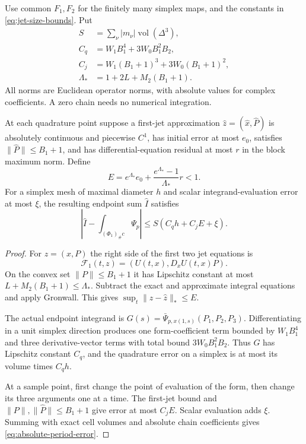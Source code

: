 Use common $F_1,F_2$ for the finitely many simplex maps, and
the constants in \eqref{eq:jet-size-bounds}. Put
\begin{equation}\label{eq:quadrature-constants}
 \begin{split}
 S&=\sum_\nu|m_\nu|\operatorname{vol}(\Delta^3),\\
 C_q&=W_1B_1^4+3W_0B_1^2B_2,\\
 C_j&=W_1(B_1+1)^3+3W_0(B_1+1)^2,\\
 \Lambda_*&=1+2L+M_2(B_1+1).
 \end{split}
\end{equation}
All norms are Euclidean operator norms, with absolute values for
complex coefficients. A zero chain needs no numerical integration.

\begin{proposition}\label{prop:absolute-period-error}
At each quadrature point suppose a first-jet approximation
$\widehat z=(\widehat x,\widehat P)$ is absolutely continuous
and piecewise $C^1$, has initial error at most $e_0$, satisfies
$\|\widehat P\|\le B_1+1$, and has differential-equation residual
at most $r$ in the block maximum norm. Define
\[
 E=e^{\Lambda_*}e_0+
             \frac{e^{\Lambda_*}-1}{\Lambda_*}r<1.
\]
For a simplex mesh of maximal diameter $h$ and scalar
integrand-evaluation error at most $\xi$, the resulting endpoint
sum $\widehat I$ satisfies
\begin{equation}\label{eq:absolute-period-error}
 \left|\widehat I-\int_{(\Phi_1)_\#c}\Psi_p\right|
                      \le S(C_qh+C_jE+\xi).
\end{equation}
\end{proposition}

\begin{proof}
For $z=(x,P)$ the right side of the first two jet equations is
\[
             \mathcal F_1(t,z)=(U(t,x),D_xU(t,x)P).
\]
On the convex set
$\|P\|\le B_1+1$ it has Lipschitz constant at most
$L+M_2(B_1+1)\le\Lambda_*$. Subtract the exact and approximate
integral equations and apply Gronwall. This gives
$\sup_t\|z-\widehat z\|_*\le E$.

The actual endpoint integrand is
$G(s)=\bar\Psi_{p,x(1,s)}(P_1,P_2,P_3)$. Differentiating in
a unit simplex direction produces one form-coefficient term
bounded by $W_1B_1^4$ and three derivative-vector terms with
total bound $3W_0B_1^2B_2$. Thus $G$ has Lipschitz constant
$C_q$, and the quadrature error on a simplex is at most its
volume times $C_qh$.

At a sample point, first change the point of evaluation of the
form, then change its three arguments one at a time. The
first-jet bound and $\|P\|,\|\widehat P\|\le B_1+1$ give
error at most $C_jE$. Scalar evaluation adds $\xi$.
Summing with exact cell volumes and absolute chain coefficients
gives \eqref{eq:absolute-period-error}.
\end{proof}

